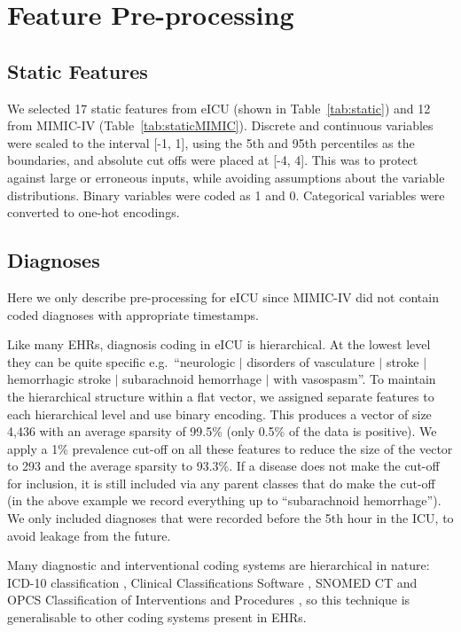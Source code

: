 \documentclass[sigconf]{acmart}
\begin{document}
\section{Feature Pre-processing}
\label{preproc}
\subsection{Static Features}
We selected 17 static features from eICU (shown in Table~\ref{tab:static}) and 12 from MIMIC-IV (Table~\ref{tab:staticMIMIC}). Discrete and continuous variables were scaled to the interval [-1, 1], using the 5th and 95th percentiles as the boundaries, and absolute cut offs were placed at [-4, 4]. This was to protect against large or erroneous inputs, while avoiding assumptions about the variable distributions. Binary variables were coded as 1 and 0. Categorical variables were converted to one-hot encodings.

\subsection{Diagnoses}
Here we only describe pre-processing for eICU since MIMIC-IV did not contain coded diagnoses with appropriate timestamps.

Like many EHRs, diagnosis coding in eICU is hierarchical. At the lowest level they can be quite specific e.g.\ ``neurologic $|$ disorders of vasculature $|$ stroke $|$ hemorrhagic stroke $|$ subarachnoid hemorrhage $|$ with vasospasm''. To maintain the hierarchical structure within a flat vector, we assigned separate features to each hierarchical level and use binary encoding. This produces a vector of size 4,436 with an average sparsity of 99.5\% (only 0.5\% of the data is positive). We apply a 1\% prevalence cut-off on all these features to reduce the size of the vector to 293 and the average sparsity to 93.3\%. If a disease does not make the cut-off for inclusion, it is still included via any parent classes that do make the cut-off (in the above example we record everything up to ``subarachnoid hemorrhage''). We only included diagnoses that were recorded before the 5th hour in the ICU, to avoid leakage from the future.

Many diagnostic and interventional coding systems are hierarchical in nature: ICD-10 classification \citep{icd10}, Clinical Classifications Software \citep{ccs}, SNOMED CT \citep{10.1016/j.cmpb.2011.01.002} and OPCS Classification of Interventions and Procedures \citep{Digital2019}, so this technique is generalisable to other coding systems present in EHRs. 
\end{document}
